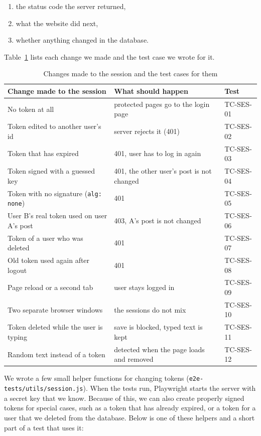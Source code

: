 \documentclass[12pt,a4paper,oneside]{report}
\newcommand{\code}[1]{\texttt{#1}}
\begin{document}
\begin{enumerate}[nosep]
  \item the status code the server returned,
  \item what the website did next,
  \item whether anything changed in the database.
\end{enumerate}

Table~\ref{tab:sessionmut} lists each change we made and the test case we
wrote for it.

\begin{table}[H]
\centering
\small
\begin{tabularx}{\textwidth}{>{\raggedright\arraybackslash}p{4.6cm}X>{\raggedright\arraybackslash}p{1.6cm}}
\toprule
\textbf{Change made to the session} & \textbf{What should happen} & \textbf{Test} \\
\midrule
No token at all & protected pages go to the login page & TC-SES-01 \\
Token edited to another user's id & server rejects it (401) & TC-SES-02 \\
Token that has expired & 401, user has to log in again & TC-SES-03 \\
Token signed with a guessed key & 401, the other user's post is not changed & TC-SES-04 \\
Token with no signature (\code{alg: none}) & 401 & TC-SES-05 \\
User B's real token used on user A's post & 403, A's post is not changed & TC-SES-06 \\
Token of a user who was deleted & 401 & TC-SES-07 \\
Old token used again after logout & 401 & TC-SES-08 \\
Page reload or a second tab & user stays logged in & TC-SES-09 \\
Two separate browser windows & the sessions do not mix & TC-SES-10 \\
Token deleted while the user is typing & save is blocked, typed text is kept & TC-SES-11 \\
Random text instead of a token & detected when the page loads and removed & TC-SES-12 \\
\bottomrule
\end{tabularx}
\caption{Changes made to the session and the test cases for them}
\label{tab:sessionmut}
\end{table}

We wrote a few small helper functions for changing tokens
(\code{e2e-tests/utils/session.js}). When the tests run, Playwright starts the
server with a secret key that we know. Because of this, we can also create
properly signed tokens for special cases, such as a token that has already
expired, or a token for a user that we deleted from the database. Below is one
of these helpers and a short part of a test that uses it:
\end{document}
